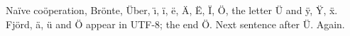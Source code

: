\documentclass{article}
\begin{document}
Na\"ive co\"operation, Br\"onte, \"Uber, \"{\i}, \"i, \"e, \"A, \"E, \"I, \"O, the letter \"U and \"y, \"Y, \"x.
Fjörd, ä, ü and Ö appear in UTF-8; the end \"O. Next sentence after \"U. Again.
\end{document}
